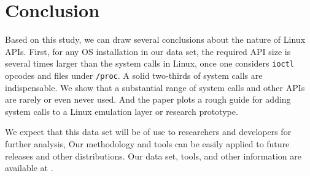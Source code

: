 \section{Conclusion}
\label{sec:conclusion}

Based on this study, we can draw several conclusions about the nature of Linux APIs.
First, for any OS installation in our data set, the required API size
is several times larger than the \syscallnum{} system calls in Linux, once one considers
{\tt ioctl} opcodes and files under {\tt /proc}.  A solid two-thirds of system calls are indispensable.
We show that a substantial range of system calls and other APIs are rarely or even never used.
And the paper plots a rough guide for adding system calls to a Linux emulation layer or research prototype.

We expect that this data set will be of use to researchers and developers for further analysis,
Our methodology and tools can be easily applied to future releases and other distributions.
Our data set, tools, and other information are available at \projecturl{}.
